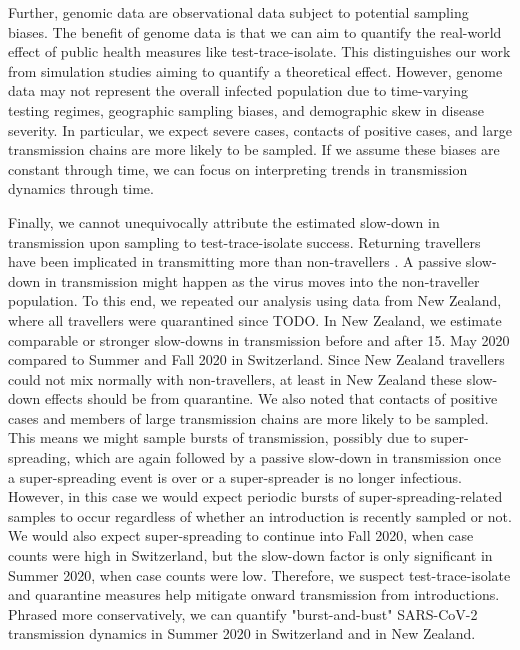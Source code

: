 \documentclass[9pt,twoside,lineno]{pnas-new} %
\begin{document}
Further, genomic data are observational data subject to potential sampling biases. The benefit of genome data is that we can aim to quantify the real-world effect of public health measures like test-trace-isolate. This distinguishes our work from simulation studies aiming to quantify a theoretical effect. However, genome data may not represent the overall infected population due to time-varying testing regimes, geographic sampling biases, and demographic skew in disease severity. In particular, we expect severe cases, contacts of positive cases, and large transmission chains are more likely to be sampled. If we assume these biases are constant through time, we can focus on interpreting trends in transmission dynamics through time. 

Finally, we cannot unequivocally attribute the estimated slow-down in transmission upon sampling to test-trace-isolate success. Returning travellers have been implicated in transmitting more than non-travellers \cite{Hodcroft2021}. A passive slow-down in transmission might happen as the virus moves into the non-traveller population. To this end, we repeated our analysis using data from New Zealand, where all travellers were quarantined since TODO. In New Zealand, we estimate comparable or stronger slow-downs in transmission before and after 15. May 2020 compared to Summer and Fall 2020 in Switzerland. Since New Zealand travellers could not mix normally with non-travellers, at least in New Zealand these slow-down effects should be from quarantine. We also noted that contacts of positive cases and members of large transmission chains are more likely to be sampled. This means we might sample bursts of transmission, possibly due to super-spreading, which are again followed by a passive slow-down in transmission once a super-spreading event is over or a super-spreader is no longer infectious. However, in this case we would expect periodic bursts of super-spreading-related samples to occur regardless of whether an introduction is recently sampled or not. We would also expect super-spreading to continue into Fall 2020, when case counts were high in Switzerland, but the slow-down factor is only significant in Summer 2020, when case counts were low. Therefore, we suspect test-trace-isolate and quarantine measures help mitigate onward transmission from introductions. Phrased more conservatively, we can quantify "burst-and-bust" SARS-CoV-2 transmission dynamics in Summer 2020 in Switzerland and in New Zealand.
\end{document}
